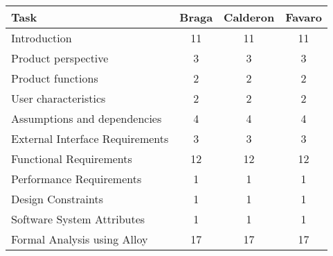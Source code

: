 \documentclass[./main.tex]{subfiles}
\begin{document}
\begin{table}[H]
\centering
\begin{tabular}{|l|c|c|c|}
\hline
Task & Braga & Calderon & Favaro\tabularnewline
\hline
Introduction & 11 & 11 & 11\tabularnewline
Product perspective & 3 & 3 & 3\tabularnewline
Product functions & 2 & 2 & 2\tabularnewline
User characteristics & 2 & 2 & 2\tabularnewline
Assumptions and dependencies & 4 & 4 & 4\tabularnewline
External Interface Requirements & 3 & 3 & 3\tabularnewline
Functional Requirements & 12 & 12 & 12\tabularnewline
Performance Requirements & 1 & 1 & 1\tabularnewline
Design Constraints & 1 & 1 & 1\tabularnewline
Software System Attributes & 1 & 1 & 1\tabularnewline
Formal Analysis using Alloy & 17 & 17 & 17\tabularnewline
\hline
\end{tabular}
\end{table}
\end{document}
